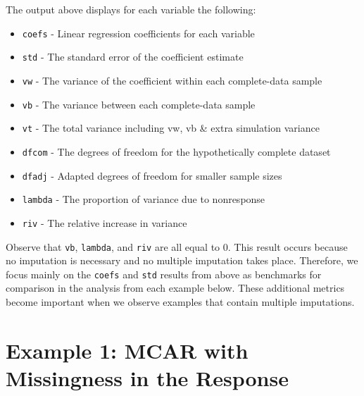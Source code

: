 \documentclass[12pt,oneside]{chicagocapstone}
\providecommand{\tightlist}{%
  \setlength{\itemsep}{0pt}\setlength{\parskip}{0pt}}
\begin{document}
The output above displays for each variable the following:
\begin{itemize}
\tightlist
\item
  \texttt{coefs} - Linear regression coefficients for each variable
\item
  \texttt{std} - The standard error of the coefficient estimate
\item
  \texttt{vw} - The variance of the coefficient within each
  complete-data sample
\item
  \texttt{vb} - The variance between each complete-data sample
\item
  \texttt{vt} - The total variance including vw, vb \& extra simulation
  variance
\item
  \texttt{dfcom} - The degrees of freedom for the hypothetically
  complete dataset
\item
  \texttt{dfadj} - Adapted degrees of freedom for smaller sample sizes
\item
  \texttt{lambda} - The proportion of variance due to nonresponse
\item
  \texttt{riv} - The relative increase in variance
\end{itemize}
Observe that \texttt{vb}, \texttt{lambda}, and \texttt{riv} are all
equal to 0. This result occurs because no imputation is necessary and no
multiple imputation takes place. Therefore, we focus mainly on the
\texttt{coefs} and \texttt{std} results from above as benchmarks for
comparison in the analysis from each example below. These additional
metrics become important when we observe examples that contain multiple
imputations.

\section*{Example 1: MCAR with Missingness in the
Response}\label{example-1-mcar-with-missingness-in-the-response}
\end{document}

